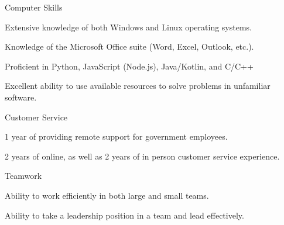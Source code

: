 
\begin{cvskills}

  \cvskill
    {Computer Skills} %
    {
	\begin{cvitems}
	\item {Extensive knowledge of both Windows and Linux operating systems.}
	\item {Knowledge of the Microsoft Office suite (Word, Excel, Outlook, etc.).}
	\item {Proficient in Python, JavaScript (Node.js), Java/Kotlin, and C/C++}
	\item {Excellent ability to use available resources to solve problems in unfamiliar software.}
	\end{cvitems}
    } %

  \cvskill
    {Customer Service} %
    {
	\begin{cvitems}
	\item {1 year of providing remote support for government employees.}
	\item {2 years of online, as well as 2 years of in person customer service experience.}
	\end{cvitems}
    } %

  \cvskill
    {Teamwork} %
    {
	\begin{cvitems}
	\item {Ability to work efficiently in both large and small teams.}
	\item {Ability to take a leadership position in a team and lead effectively.}
	\end{cvitems}
    } %

\end{cvskills}

